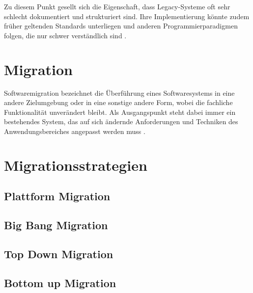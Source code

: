 Zu diesem Punkt gesellt sich die Eigenschaft, dass Legacy-Systeme oft sehr schlecht dokumentiert und strukturiert sind. Ihre Implementierung könnte zudem früher geltenden Standards unterliegen und anderen Programmierparadigmen folgen, die nur schwer verständlich sind \cite{stahlknecht2002einfuhrung}.

\section{Migration} \label{ssub:migration}
Softwaremigration bezeichnet die Überführung eines Softwaresystems in eine andere Zielumgebung oder in eine sonstige andere Form, wobei die fachliche Funktionalität unverändert bleibt. Als Ausgangspunkt steht dabei immer ein bestehendes System, das auf sich ändernde Anforderungen und Techniken des Anwendungsbereiches angepasst werden muss \cite{sneed2016softwaremigration}.

\section{Migrationsstrategien}

\subsection{Plattform Migration}

\subsection{Big Bang Migration}

\subsection{Top Down Migration}

\subsection{Bottom up Migration}


